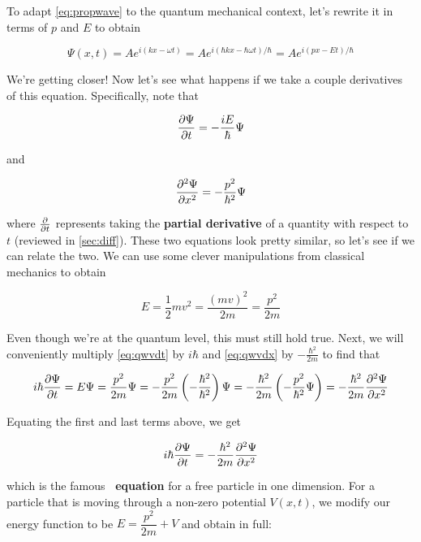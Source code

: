 To adapt \autoref{eq:propwave} to the quantum mechanical context, let's rewrite it in terms of $p$ and $E$ to obtain

\begin{equation}
	\Psi(x,t) = Ae^{i(kx-\omega t)} = Ae^{i(\hbar kx - \hbar\omega t)/\hbar}  = Ae^{i(px-Et)/\hbar} \label{eq:qwave}
\end{equation}

We're getting closer! 
Now let's see what happens if we take a couple derivatives of this equation. 
Specifically, note that

\begin{equation}
	\pdv{\Psi}{t} = -\frac{iE}{\hbar}\Psi 		\label{eq:qwvdt}
\end{equation}

\noindent and

\begin{equation}
	\pdv[2]{\Psi}{x} = -\frac{p^2}{\hbar^2}\Psi \label{eq:qwvdx}
\end{equation}

\noindent where $\pdv{t}$ represents taking the \textbf{partial derivative} of a quantity with respect to $t$ (reviewed in \autoref{sec:diff}). 
These two equations look pretty similar, so let's see if we can relate the two. 
We can use some clever manipulations from classical mechanics to obtain 

\begin{equation} 
	E = \frac{1}{2}mv^2 = \frac{(mv)^2}{2m} = \frac{p^2}{2m}
\end{equation}

Even though we're at the quantum level, this must still hold true. 
Next, we will conveniently multiply \autoref{eq:qwvdt} by $i\hbar$ and \autoref{eq:qwvdx} by $-\frac{\hbar^2}{2m}$ to find that

\begin{equation*}
	i\hbar \pdv{\Psi}{t} = E\Psi = \frac{p^2}{2m} \Psi 
	= -\frac{p^2}{2m} \left( -\frac{\hbar^2}{\hbar^2} \right) \Psi = -\frac{\hbar^2}{2m} \left( -\frac{p^2}{\hbar^2}\Psi \right) 
	= -\frac{\hbar^2}{2m} \pdv[2]{\Psi}{x}
\end{equation*}

Equating the first and last terms above, we get 

\begin{equation}
	i\hbar \pdv{\Psi}{t} = -\frac{\hbar^2}{2m} \pdv[2]{\Psi}{x}
\end{equation}

\noindent which is the famous \textbf{\Sch\ equation} for a free particle in one dimension. 
For a particle that is moving through a non-zero potential $V(x,t)$, we modify our energy function to be $E = \dfrac{p^2}{2m} + V$ and obtain in full: 

